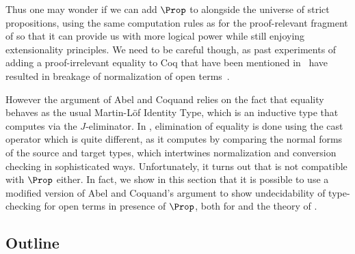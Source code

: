   Thus one may wonder if we can add \( \Prop \) to \SetoidCC alongside the
  universe of strict propositions, using the same computation rules as for the
  proof-relevant fragment of \SetoidCC so that it can provide us with
  more logical power while still enjoying extensionality principles.
  We need to be careful though, as past experiments of adding a
  proof-irrelevant equality to Coq that have been mentioned
  in~ have resulted in breakage of
  normalization of open terms~.
  
  However the argument of Abel and Coquand relies on the fact that
  equality behaves as the usual Martin-Löf Identity Type, which is an
  inductive type that computes via the \( J \)-eliminator.
  In \SetoidCC, elimination of equality is done using the cast operator
  which is quite different, as it computes by comparing the normal forms
  of the source and target types, which intertwines normalization and
  conversion checking in sophisticated ways.
  Unfortunately, it turns out that \SetoidCC is not compatible with \( \Prop \)
  either.
  In fact, we show in this section that it is possible to use a modified
  version of Abel and Coquand's argument to show undecidability of
  type-checking for open terms in presence of \( \Prop \), both for
  \SetoidCC and the theory of .
  
  \subsection{Outline}
  
